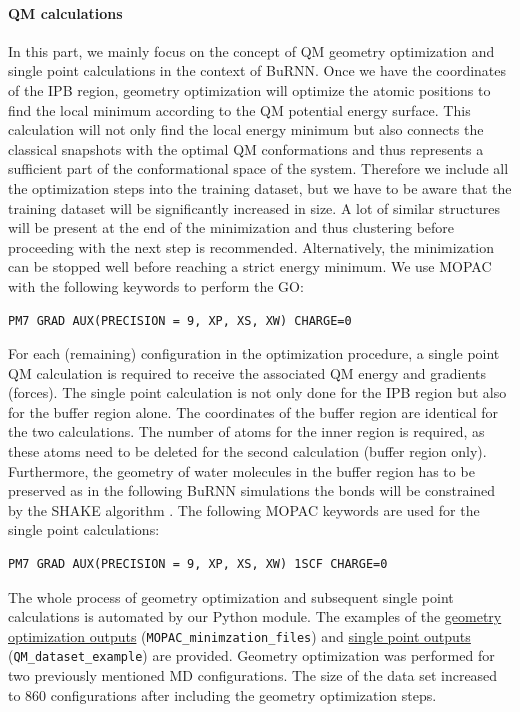 \paragraph{QM calculations}
In this part, we mainly focus on the concept of QM geometry optimization and single point calculations in the context of BuRNN. Once we have the coordinates of the IPB region, geometry optimization will optimize the atomic positions to find the local minimum according to the QM potential energy surface. This calculation will not only find the local energy minimum but also connects the classical snapshots with the optimal QM conformations and thus represents a sufficient part of the conformational space of the system. Therefore we include all the optimization steps into the training dataset, but we have to be aware that the training dataset will be significantly increased in size. A lot of similar structures will be present at the end of the minimization and thus clustering before proceeding with the next step is recommended. Alternatively, the minimization can be stopped well before reaching a strict energy minimum. We use MOPAC with the following keywords to perform the GO:

\begin{lstlisting}[breaklines=true, breakatwhitespace=false]
PM7 GRAD AUX(PRECISION = 9, XP, XS, XW) CHARGE=0
\end{lstlisting}

For each (remaining) configuration in the optimization procedure, a single point QM calculation is required to receive the associated QM energy and gradients (forces). The single point calculation is not only done for the IPB region but also for the buffer region alone. The coordinates of the buffer region are identical for the two calculations. The number of atoms for the inner region is required, as these atoms need to be deleted for the second calculation (buffer region only). Furthermore, the geometry of water molecules in the buffer region has to be preserved as in the following BuRNN simulations the bonds will be constrained by the SHAKE algorithm \cite{RYCKAERT1977SHAKE}. The following MOPAC keywords are used for the single point calculations:

\begin{lstlisting}[breaklines=true, breakatwhitespace=false]
PM7 GRAD AUX(PRECISION = 9, XP, XS, XW) 1SCF CHARGE=0
\end{lstlisting}


The whole process of geometry optimization and subsequent single point calculations is automated by our Python module. The examples of the \href{https://github.com/LierB/gromos_tutorial_livecoms/tree/burnn_tutorial_rc/tutorial_files/t_06/train_dataset_tutorial/MOPAC_minimzation_files}{geometry optimization outputs} (\texttt{MOPAC\_minimzation\_files}) and \href{https://github.com/LierB/gromos_tutorial_livecoms/tree/burnn_tutorial_rc/tutorial_files/t_06/train_dataset_tutorial/QM_dataset_example}{single point outputs} (\texttt{QM\_dataset\_example}) are provided. Geometry optimization was performed for two previously mentioned MD configurations. The size of the data set increased to 860 configurations after including the geometry optimization steps.


